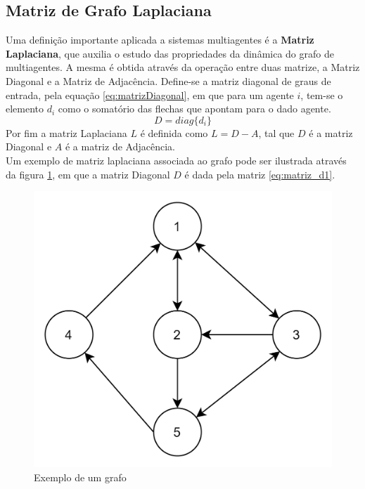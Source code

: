 \subsection{Matriz de Grafo Laplaciana}
Uma definição importante aplicada a sistemas multiagentes é a \textbf{Matriz Laplaciana}, que auxilia o estudo das propriedades da dinâmica do grafo de multiagentes. A mesma é obtida através da operação entre duas matrize, a Matriz Diagonal e a Matriz de Adjacência.
Define-se a matriz diagonal de graus de entrada, pela equação \ref{eq:matrizDiagonal}, em que para um agente $i$, tem-se o elemento $d_{i}$ como o somatório das flechas que apontam para o dado agente.
\begin{equation}\label{eq:matrizDiagonal}
    D = diag\{d_{i}\}
\end{equation}
Por fim a matriz Laplaciana $L$ é definida como $L = D-A$, tal que $D$ é a matriz Diagonal e $A$ é a matriz de Adjacência.
\\
Um exemplo de matriz laplaciana associada ao grafo pode ser ilustrada através da figura \ref{fig:exemplo_grafo}, em que a matriz Diagonal $D$ é dada pela matriz \ref{eq:matriz_d1}. 

\begin{figure}
    \centering
    \includegraphics[scale=0.2]{figures/Multiagente/ex_grafos1.png}
    \caption{Exemplo de um grafo}
    \label{fig:exemplo_grafo}
\end{figure}

